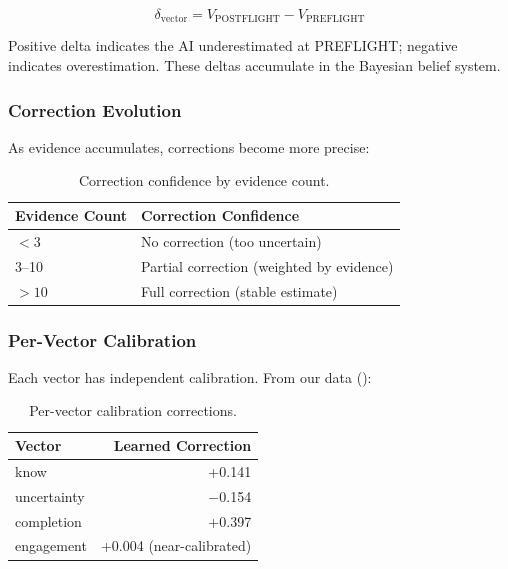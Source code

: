 \begin{equation}
\delta_{\text{vector}} = V_{\text{POSTFLIGHT}} - V_{\text{PREFLIGHT}}
\end{equation}

Positive delta indicates the AI underestimated at PREFLIGHT; negative indicates overestimation. These deltas accumulate in the Bayesian belief system.

\subsubsection{Correction Evolution}

As evidence accumulates, corrections become more precise:

\begin{table}[h]
\centering
\begin{tabular}{ll}
\toprule
\textbf{Evidence Count} & \textbf{Correction Confidence} \\
\midrule
$< 3$ & No correction (too uncertain) \\
3--10 & Partial correction (weighted by evidence) \\
$> 10$ & Full correction (stable estimate) \\
\bottomrule
\end{tabular}
\caption{Correction confidence by evidence count.}
\label{tab:correction-evolution}
\end{table}

\subsubsection{Per-Vector Calibration}

Each vector has independent calibration. From our data ():

\begin{table}[h]
\centering
\begin{tabular}{lr}
\toprule
\textbf{Vector} & \textbf{Learned Correction} \\
\midrule
know & +0.141 \\
uncertainty & $-$0.154 \\
completion & +0.397 \\
engagement & +0.004 (near-calibrated) \\
\bottomrule
\end{tabular}
\caption{Per-vector calibration corrections.}
\label{tab:per-vector-calibration}
\end{table}

